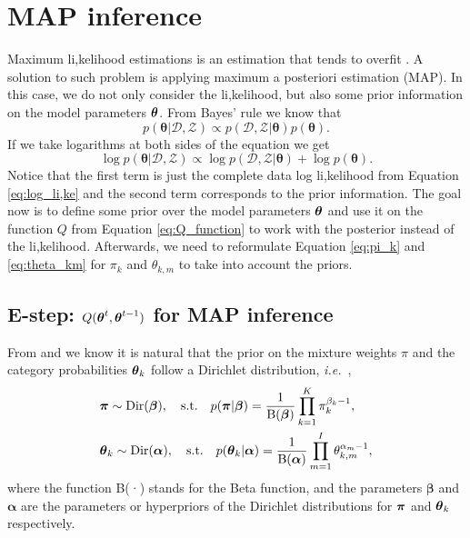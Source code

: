 \documentclass[12pt]{article}
\begin{document}
\section{MAP inference}

Maximum li,kelihood estimations is an estimation that tends to overfit \cite{murphy2012machine}. A solution to such problem is applying maximum a posteriori estimation (MAP). In this case, we do not only consider the li,kelihood, but also some prior information on the model parameters $\boldsymbol\theta$. From Bayes' rule we know that
\begin{equation}
p(\boldsymbol{\theta}|\mathcal{D},\mathcal{Z}) \varpropto p(\mathcal{D},\mathcal{Z}|\boldsymbol{\theta})p(\boldsymbol{\theta}).
\end{equation}
If we take logarithms at both sides of the equation we get
\begin{equation}
\log p(\boldsymbol{\theta}|\mathcal{D},\mathcal{Z}) \varpropto \log p(\mathcal{D},\mathcal{Z}|\boldsymbol{\theta}) + \log p(\boldsymbol{\theta}) .
\end{equation}
Notice that the first term is just the complete data log li,kelihood from Equation \ref{eq:log_li,ke} and the second term corresponds to the prior information. The goal now is to define some prior over the model parameters $\boldsymbol\theta$ and use it on the function $Q$ from Equation \ref{eq:Q_function} to work with the posterior instead of the li,kelihood. Afterwards, we need to reformulate Equation \ref{eq:pi_k} and \ref{eq:theta_km} for $\pi_k$ and $\theta_{k,m}$ to take into account the priors.\\

\subsection{E-step: $Q(\boldsymbol\theta^t, \boldsymbol\theta^{t-1})$ for MAP inference}
\noindent From \cite{notesArtes} and \cite{murphy2012machine} we know it is natural that the prior on the mixture weights $\pi$ and the category probabilities $\boldsymbol\theta_k$ follow a Dirichlet distribution, \textit{i.e.\ },
\begin{align}\label{priors}
& \boldsymbol\pi \sim \text{Dir}(\boldsymbol\beta), \quad \text{s.t.} \quad  p(\boldsymbol\pi |\boldsymbol\beta) = \dfrac{1}{\text{B}(\boldsymbol{\beta})} \prod \limits_{k=1}^{K} \pi_{k}^{\beta_{k}-1}, \\
& \boldsymbol\theta_{k} \sim \text{Dir}(\boldsymbol\alpha), \quad \text{s.t.} \quad p(\boldsymbol\theta_{k}|\boldsymbol\alpha) = \dfrac{1}{\text{B}(\boldsymbol{\alpha})} \prod \limits_{m=1}^{I} \theta_{k,m}^{\alpha_{m}-1},
\end{align}
where the function B(·) stands for the Beta function, and the parameters $\boldsymbol{\beta}$ and $\boldsymbol{\alpha}$ are the parameters or hyperpriors of the Dirichlet distributions for $\boldsymbol\pi$ and $\boldsymbol\theta_{k}$ respectively. \\
\end{document}

